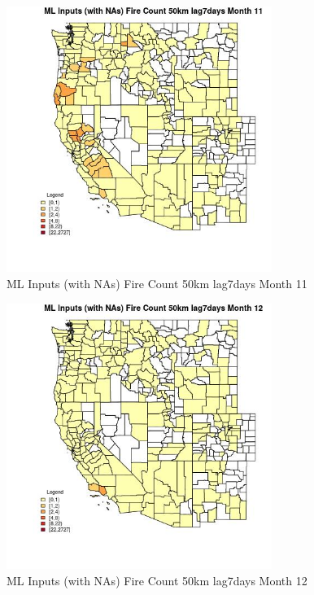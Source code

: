 \begin{figure} 
\centering  
\includegraphics[width=0.77\textwidth]{Code_Outputs/Report_ML_input_PM25_Step4_part_f_de_duplicated_aves_prioritize_24hr_obswNAs_CountyFire_Count_50km_lag7daysmedianMonth11.jpg} 
\caption{\label{fig:Report_ML_input_PM25_Step4_part_f_de_duplicated_aves_prioritize_24hr_obswNAsCountyFire_Count_50km_lag7daysmedianMonth11}ML Inputs (with NAs) Fire Count 50km lag7days Month 11} 
\end{figure} 
 

\begin{figure} 
\centering  
\includegraphics[width=0.77\textwidth]{Code_Outputs/Report_ML_input_PM25_Step4_part_f_de_duplicated_aves_prioritize_24hr_obswNAs_CountyFire_Count_50km_lag7daysmedianMonth12.jpg} 
\caption{\label{fig:Report_ML_input_PM25_Step4_part_f_de_duplicated_aves_prioritize_24hr_obswNAsCountyFire_Count_50km_lag7daysmedianMonth12}ML Inputs (with NAs) Fire Count 50km lag7days Month 12} 
\end{figure} 
 

